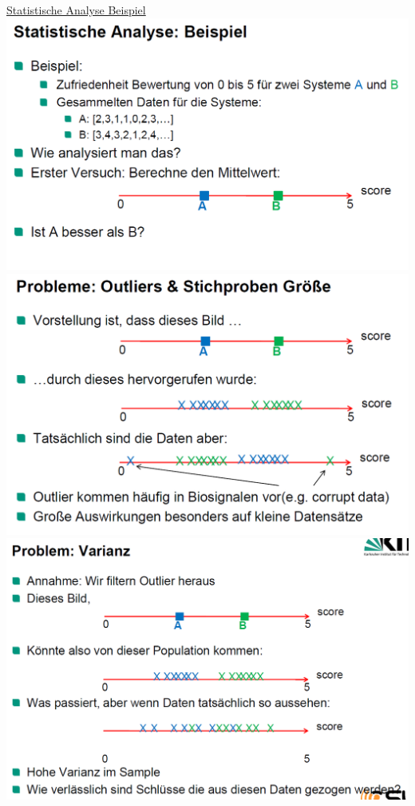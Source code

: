 \documentclass[a4paper,10pt,oneside]{article}
\begin{document}
\underline{Statistische Analyse Beispiel} \\
 \includegraphics[scale=0.2]{Grafiken/2418.png}
 \includegraphics[scale=0.2]{Grafiken/2419.png}
 \includegraphics[scale=0.2]{Grafiken/2420.png}
\end{document}

